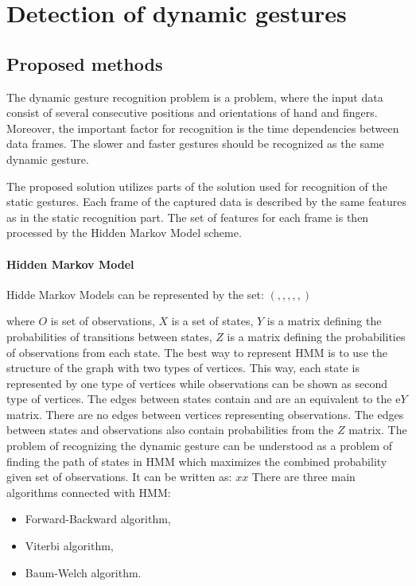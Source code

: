 \chapter{Detection of dynamic gestures}

\section{Proposed methods}

The dynamic gesture recognition problem is a problem, where the input data consist of several consecutive positions and orientations of hand and fingers. 
Moreover, the important factor for recognition is the time dependencies between data frames. The slower and faster gestures should be recognized as the same dynamic gesture.

The proposed solution utilizes parts of the solution used for recognition of the static gestures.
Each frame of the captured data is described by the same features as in the static recognition part.
The set of features for each frame is then processed by the Hidden Markov Model scheme. 

\subsubsection{Hidden Markov Model}

Hidde Markov Models can be represented by the set:
$ ( , , , , , )$

where $O$ is set of observations, $X$ is a set of states, $Y$ is a matrix defining the probabilities of transitions between states, $Z$ is a matrix defining the probabilities of observations from each state.
The best way to represent HMM is to use the structure of the graph with two types of vertices. 
This way, each state is represented by one type of vertices while observations can be shown as second type of vertices.
The edges between states contain and are an equivalent to the e$Y$ matrix. 
There are no edges between vertices representing observations.
The edges between states and observations also contain probabilities from the $Z$ matrix.
The problem of recognizing the dynamic gesture can be understood as a problem of finding the path of states in HMM which maximizes the combined probability given set of observations. It can be written as:
$ xx $
There are three main algorithms connected with HMM:
\begin{itemize}
\item Forward-Backward algorithm, 
\item Viterbi algorithm,
\item Baum-Welch algorithm.
\end{itemize}

